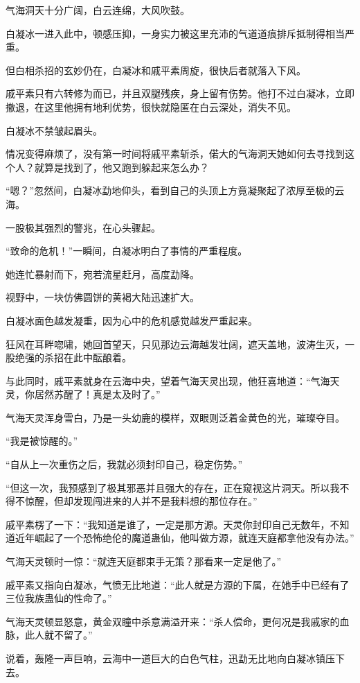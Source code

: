 \begin{this_body}
气海洞天十分广阔，白云连绵，大风吹鼓。

白凝冰一进入此中，顿感压抑，一身实力被这里充沛的气道道痕排斥抵制得相当严重。

但白相杀招的玄妙仍在，白凝冰和戚平素周旋，很快后者就落入下风。

戚平素只有六转修为而已，并且双腿残疾，身上留有伤势。他打不过白凝冰，立即撤退，在这里他拥有地利优势，很快就隐匿在白云深处，消失不见。

白凝冰不禁皱起眉头。

情况变得麻烦了，没有第一时间将戚平素斩杀，偌大的气海洞天她如何去寻找到这个人？就算是找到了，他又跑到躲起来怎么办？

“嗯？”忽然间，白凝冰勐地仰头，看到自己的头顶上方竟凝聚起了浓厚至极的云海。

一股极其强烈的警兆，在心头骤起。

“致命的危机！”一瞬间，白凝冰明白了事情的严重程度。

她连忙暴射而下，宛若流星赶月，高度勐降。

视野中，一块仿佛圆饼的黄褐大陆迅速扩大。

白凝冰面色越发凝重，因为心中的危机感觉越发严重起来。

狂风在耳畔唿啸，她回首望天，只见那边云海越发壮阔，遮天盖地，波涛生灭，一股绝强的杀招在此中酝酿着。

与此同时，戚平素就身在云海中央，望着气海天灵出现，他狂喜地道：“气海天灵，你居然苏醒了！真是太及时了。”

气海天灵浑身雪白，乃是一头幼鹿的模样，双眼则泛着金黄色的光，璀璨夺目。

“我是被惊醒的。”

“自从上一次重伤之后，我就必须封印自己，稳定伤势。”

“但这一次，我预感到了极其邪恶并且强大的存在，正在窥视这片洞天。所以我不得不惊醒，但却发现闯进来的人并不是我料想的那位存在。”

戚平素楞了一下：“我知道是谁了，一定是那方源。天灵你封印自己无数年，不知道近年崛起了一个恐怖绝伦的魔道蛊仙，他叫做方源，就连天庭都拿他没有办法。”

气海天灵顿时一惊：“就连天庭都束手无策？那看来一定是他了。”

戚平素又指向白凝冰，气愤无比地道：“此人就是方源的下属，在她手中已经有了三位我族蛊仙的性命了。”

气海天灵顿显怒意，黄金双瞳中杀意满溢开来：“杀人偿命，更何况是我戚家的血脉，此人就不留了。”

说着，轰隆一声巨响，云海中一道巨大的白色气柱，迅勐无比地向白凝冰镇压下去。


\end{this_body}
